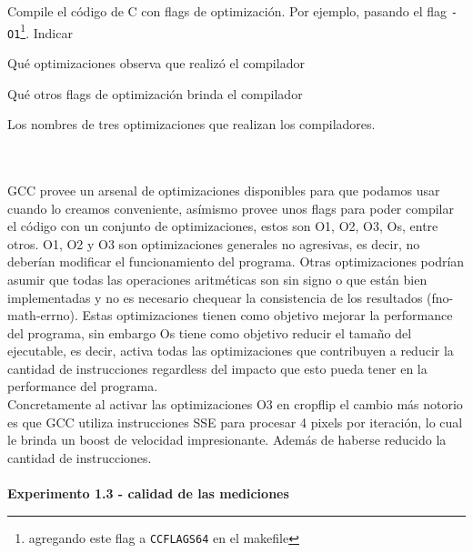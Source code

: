 Compile el código de C con flags de optimización. Por ejemplo, pasando el flag 
\verb|-O1|\footnote{agregando este flag a \texttt{CCFLAGS64} en el makefile}. 
Indicar\\
\begin{inparaenum}
    \item Qué optimizaciones observa que realizó el compilador\\
    \item Qué otros flags de optimización brinda el compilador\\
    \item Los nombres de tres optimizaciones que realizan los compiladores.\\
\end{inparaenum}\\
\\
\indent GCC provee un arsenal de optimizaciones disponibles para que podamos usar cuando lo creamos conveniente, asímismo provee unos flags para poder compilar el código con un conjunto de optimizaciones, estos son O1, O2, O3, Os, entre otros. O1, O2 y O3 son optimizaciones generales no agresivas, es decir, no deberían modificar el funcionamiento del programa. Otras optimizaciones podrían asumir que todas las operaciones aritméticas son sin signo o que están bien implementadas y no es necesario chequear la consistencia de los resultados (fno-math-errno). Estas optimizaciones tienen como objetivo mejorar la performance del programa, sin embargo Os tiene como objetivo reducir el tamaño del ejecutable, es decir, activa todas las optimizaciones que contribuyen a reducir la cantidad de instrucciones regardless del impacto que esto pueda tener en la performance del programa. \\
\indent Concretamente al activar las optimizaciones O3 en cropflip el cambio más notorio es que GCC utiliza instrucciones SSE para procesar 4 pixels por iteración, lo cual le brinda un boost de velocidad impresionante. Además de haberse reducido la cantidad de instrucciones. \\
\\
\vspace*{0.3cm} \noindent
\textbf{Experimento 1.3 - calidad de las mediciones}

